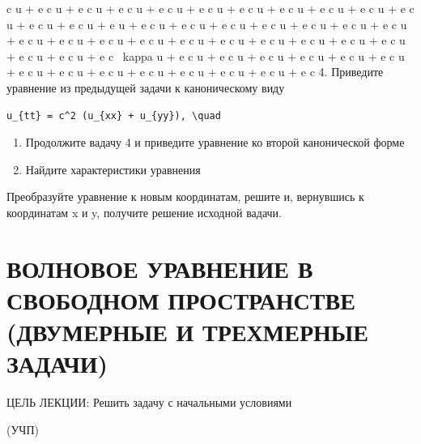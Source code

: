 \documentclass[
  ukrainian,
]{article}
\begin{document}
c \kappa u + e c \kappa u + e c \kappa u + e c \kappa u + e c \kappa u +
e c \kappa u + e c \kappa u + e c \kappa u + e c \kappa u + e c \kappa u
+ e c \kappa u + e c \kappa u + e c \kappa u + e u + e c \kappa u + e c
\kappa u + e c \kappa u + e c \kappa u + e c \kappa u + e c \kappa u + e
c \kappa u + e c \kappa u + e c \kappa u + e c \kappa u + e c \kappa u +
e c \kappa u + e c \kappa u + e c \kappa u + e c \kappa u + e c \kappa u
+ e c \kappa u + e c \kappa u + e c \kappa u + e c ~kappa u + e c
\kappa u + e c \kappa u + e c \kappa u + e c \kappa u + e c \kappa u + e
c \kappa u + e c \kappa u + e c \kappa u + e c \kappa u + e c \kappa u +
e c \kappa u + e c \kappa u + e c \kappa u + e c 4. Приведите уравнение
из предыдущей задачи к каноническому виду

\begin{verbatim}
u_{tt} = c^2 (u_{xx} + u_{yy}), \quad
\end{verbatim}

\begin{enumerate}
\def\labelenumi{\arabic{enumi}.}
\setcounter{enumi}{4}
\item
  Продолжите вадачу 4 и приведите уравнение ко второй канонической форме
\item
  Найдите характеристики уравнения
\end{enumerate}

Преобразуйте уравнение к новым координатам, решите и, вернувшись к
координатам x и y, получите решение исходной вадачи.

\section{ВОЛНОВОЕ УРАВНЕНИЕ В СВОБОДНОМ ПРОСТРАНСТВЕ (ДВУМЕРНЫЕ И
ТРЕХМЕРНЫЕ
ЗАДАЧИ)}\label{ux432ux43eux43bux43dux43eux432ux43eux435-ux443ux440ux430ux432ux43dux435ux43dux438ux435-ux432-ux441ux432ux43eux431ux43eux434ux43dux43eux43c-ux43fux440ux43eux441ux442ux440ux430ux43dux441ux442ux432ux435-ux434ux432ux443ux43cux435ux440ux43dux44bux435-ux438-ux442ux440ux435ux445ux43cux435ux440ux43dux44bux435-ux437ux430ux434ux430ux447ux438}

ЦЕЛЬ ЛЕКЦИИ: Решить задачу с начальными условиями

(УЧП)
\end{document}
